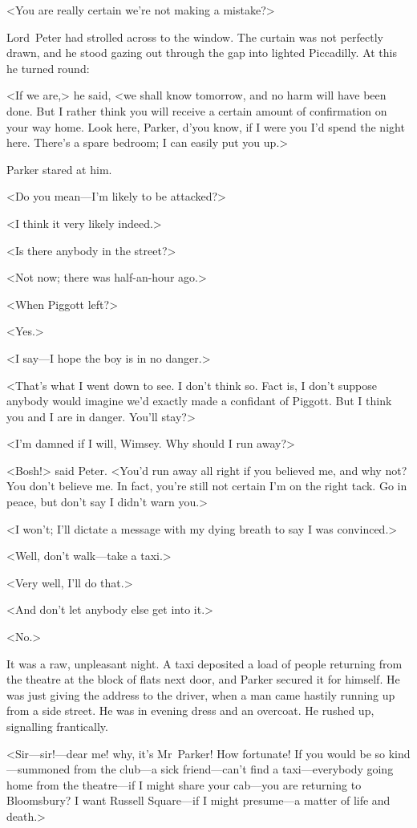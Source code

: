 <You are really certain we're not making a mistake?>

Lord~Peter had strolled across to the window. The curtain was not perfectly drawn, and he stood gazing out through the gap into lighted Piccadilly. At this he turned round:

<If we are,> he said, <we shall know tomorrow, and no harm will have been done. But I rather think you will receive a certain amount of confirmation on your way home. Look here, Parker, d'you know, if I were you I'd spend the night here. There's a spare bedroom; I can easily put you up.>

Parker stared at him.

<Do you mean—I'm likely to be attacked?>

<I think it very likely indeed.>

<Is there anybody in the street?>

<Not now; there was half-an-hour ago.>

<When Piggott left?>

<Yes.>

<I say—I hope the boy is in no danger.>

<That's what I went down to see. I don't think so. Fact is, I don't suppose anybody would imagine we'd exactly made a confidant of Piggott. But I think you and I are in danger. You'll stay?>

<I'm damned if I will, Wimsey. Why should I run away?>

<Bosh!> said Peter. <You'd run away all right if you believed me, and why not? You don't believe me. In fact, you're still not certain I'm on the right tack. Go in peace, but don't say I didn't warn you.>

<I won't; I'll dictate a message with my dying breath to say I was convinced.>

<Well, don't walk—take a taxi.>

<Very well, I'll do that.>

<And don't let anybody else get into it.>

<No.>

It was a raw, unpleasant night. A taxi deposited a load of people returning from the theatre at the block of flats next door, and Parker secured it for himself. He was just giving the address to the driver, when a man came hastily running up from a side street. He was in evening dress and an overcoat. He rushed up, signalling frantically.

<Sir—sir!—dear me! why, it's Mr~Parker! How fortunate! If you would be so kind—summoned from the club—a sick friend—can't find a taxi—everybody going home from the theatre—if I might share your cab—you are returning to Bloomsbury? I want Russell Square—if I might presume—a matter of life and death.>

